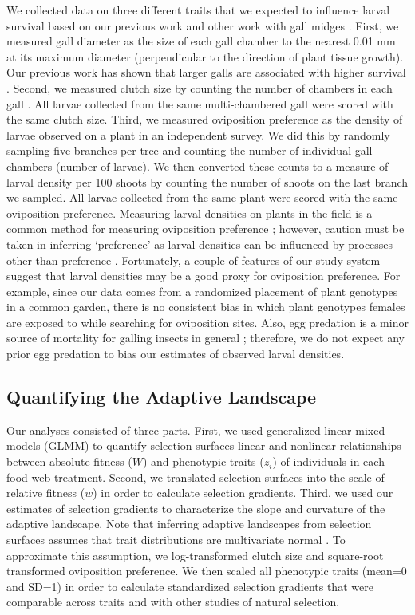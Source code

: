 \documentclass[11pt,]{article}
\begin{document}
We collected data on three different traits that we expected to
influence larval survival based on our previous work \citep{Barbour2016}
and other work with gall midges \citep{Weis1983, Heath2018}. First, we
measured gall diameter as the size of each gall chamber to the nearest
0.01 mm at its maximum diameter (perpendicular to the direction of plant
tissue growth). Our previous work has shown that larger galls are
associated with higher survival \citep{Barbour2016}. Second, we measured
clutch size by counting the number of chambers in each gall
\citep{Weis1983, Heath2018}. All larvae collected from the same
multi-chambered gall were scored with the same clutch size. Third, we
measured oviposition preference as the density of larvae observed on a
plant in an independent survey. We did this by randomly sampling five
branches per tree and counting the number of individual gall chambers
(number of larvae). We then converted these counts to a measure of
larval density per 100 shoots by counting the number of shoots on the
last branch we sampled. All larvae collected from the same plant were
scored with the same oviposition preference. Measuring larval densities
on plants in the field is a common method for measuring oviposition
preference \citep{Gripenberg2010}; however, caution must be taken in
inferring `preference' as larval densities can be influenced by
processes other than preference \citep{Singer1986}. Fortunately, a
couple of features of our study system suggest that larval densities may
be a good proxy for oviposition preference. For example, since our data
comes from a randomized placement of plant genotypes in a common garden,
there is no consistent bias in which plant genotypes females are exposed
to while searching for oviposition sites. Also, egg predation is a minor
source of mortality for galling insects in general \citep{Hawkins1997};
therefore, we do not expect any prior egg predation to bias our
estimates of observed larval densities.

\subsection{Quantifying the Adaptive
Landscape}\label{quantifying-the-adaptive-landscape}

Our analyses consisted of three parts. First, we used generalized linear
mixed models (GLMM) to quantify selection surfaces \textemdash linear
and nonlinear relationships between absolute fitness (\(W\)) and
phenotypic traits (\(z_i\)) of individuals \textemdash in each food-web
treatment. Second, we translated selection surfaces into the scale of
relative fitness (\(w\)) in order to calculate selection gradients.
Third, we used our estimates of selection gradients to characterize the
slope and curvature of the adaptive landscape. Note that inferring
adaptive landscapes from selection surfaces assumes that trait
distributions are multivariate normal \citep{Lande1983}. To approximate
this assumption, we log-transformed clutch size and square-root
transformed oviposition preference. We then scaled all phenotypic traits
(mean=0 and SD=1) in order to calculate standardized selection gradients
that were comparable across traits and with other studies of natural
selection.
\end{document}
